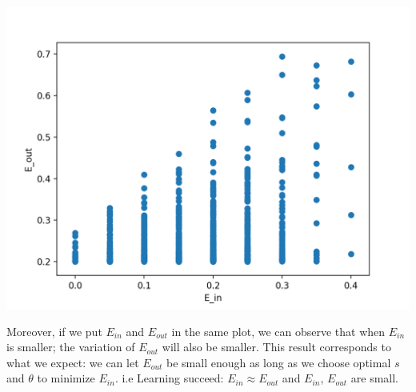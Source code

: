\documentclass[a4paper,12pt]{article}
\begin{document}
  \begin{minipage}{\linewidth}
      \begin{minipage}{0.5\linewidth}
\raggedright
         \includegraphics[scale=0.55]{Q82.png}

      \end{minipage}
      \hspace{0.05\linewidth}
      \begin{minipage}{0.4\linewidth}
       Moreover, if we put $E_{in}$ and $E_{out}$ in the same plot, we can observe that when $E_{in}$ is smaller; the variation of $E_{out}$ will also be smaller. This result corresponds to what we expect: we can let $E_{out}$ be small enough as long as we choose optimal $s$ and $\theta$ to minimize $E_{in}$. i.e Learning succeed: $E_{in} \approx E_{out}$ and $E_{in}$, $E_{out}$ are small.
      \end{minipage}
  \end{minipage}
\end{document}
